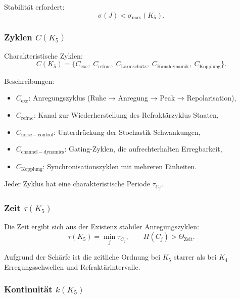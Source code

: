Stabilität erfordert:
\[
\sigma(J) < \sigma_{\max}(K_5).
\]

\subsubsection{Zyklen \texorpdfstring{$C(K_5)$}{C(K_5)}}

Charakteristische Zyklen:
\[
C(K_5)
= \{ C_{\mathrm{exc}},\;
     C_{\mathrm{refrac}},\;
     C_{\mathrm{Lärmschutz}},\;
     C_{\mathrm{Kanaldynamik}},\;
     C_{\mathrm{Kopplung}} \}.
\]

Beschreibungen:
\begin{itemize}
    \item $C_{\mathrm{exc}}$: Anregungszyklus (Ruhe → Anregung →
          Peak → Repolarisation),
    \item $C_{\mathrm{refrac}}$: Kanal zur Wiederherstellung des Refraktärzyklus
          Staaten,
    \item $C_{\mathrm{noise-control}}$: Unterdrückung der Stochastik
          Schwankungen,
    \item $C_{\mathrm{channel-dynamics}}$: Gating-Zyklen, die aufrechterhalten
          Erregbarkeit,
    \item $C_{\mathrm{Kopplung}}$: Synchronisationszyklen mit mehreren Einheiten.
\end{itemize}

Jeder Zyklus hat eine charakteristische Periode $\tau_{C_j}$.

\subsubsection{Zeit \texorpdfstring{$\tau(K_5)$}{\tau(K_5)}}

Die Zeit ergibt sich aus der Existenz stabiler Anregungszyklen:
\[
\tau(K_5)
    = \min_j \tau_{C_j},
\qquad
\Pi(C_j) > \Theta_{\mathrm{Zeit}}.
\]

Aufgrund der Schärfe ist die zeitliche Ordnung bei $K_5$ starrer als bei $K_4$
Erregungsschwellen und Refraktärintervalle.

\subsubsection{Kontinuität \texorpdfstring{$k(K_5)$}{k(K_5)}}

